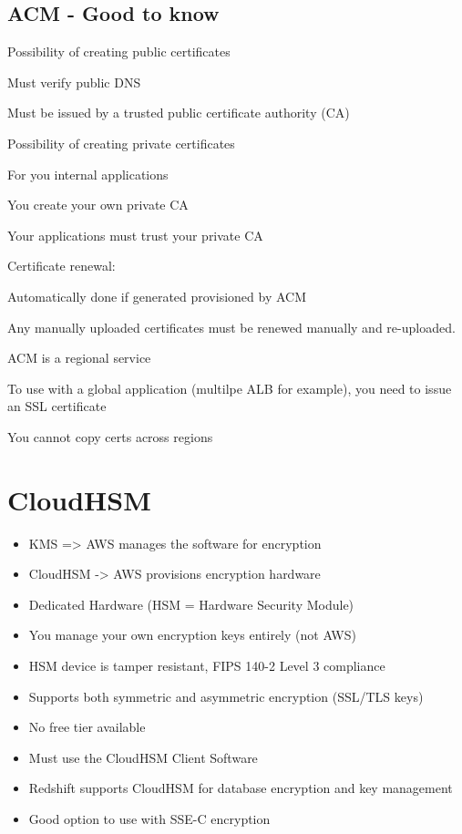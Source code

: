 
\subsection{ACM - Good to know}
\item Possibility of creating public certificates
\item Must verify public DNS
\item Must be issued by a trusted public certificate authority (CA)
\item Possibility of creating private certificates
\item For you internal applications
\item You create your own private CA
\item Your applications must trust your private CA
\item Certificate renewal:
\item Automatically done if generated provisioned by ACM
\item Any manually uploaded certificates must be renewed manually and re-uploaded.
\item ACM is a regional service
\item To use with a global application (multilpe ALB for example), you need to issue an SSL certificate
\item You cannot copy certs across regions


\section{CloudHSM}
\begin{itemize}
    \item KMS => AWS manages the software for encryption
    \item CloudHSM -> AWS provisions encryption hardware
    \item Dedicated Hardware (HSM = Hardware Security Module)
    \item You manage your own encryption keys entirely (not AWS)
    \item HSM device is tamper resistant, FIPS 140-2 Level 3 compliance
    \item Supports both symmetric and asymmetric encryption (SSL/TLS keys)
    \item No free tier available
    \item Must use the CloudHSM Client Software
    \item Redshift supports CloudHSM for database encryption and key management
    \item Good option to use with SSE-C encryption
\end{itemize}

